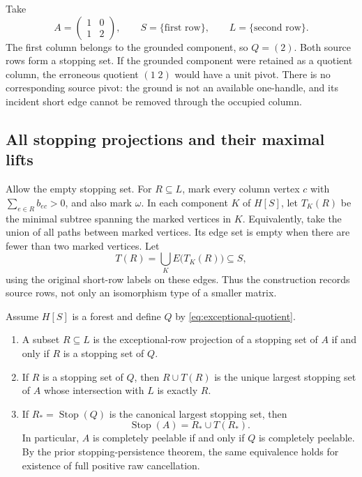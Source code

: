 \begin{example}
Take
\[
 A=\begin{pmatrix}1&0\\1&2\end{pmatrix},
 \qquad S=\{\text{first row}\},\qquad
 L=\{\text{second row}\}.
\]
The first column belongs to the grounded component, so $Q=(2)$. Both
source rows form a stopping set. If the grounded component were retained
as a quotient column, the erroneous quotient $(1\;2)$ would have a unit
pivot. There is no corresponding source pivot: the ground is not an
available one-handle, and its incident short edge cannot be removed
through the occupied column.
\end{example}

\subsection{All stopping projections and their maximal lifts}

Allow the empty stopping set. For $R\subseteq L$, mark every column
vertex $c$ with $\sum_{e\in R}b_{ec}>0$, and also mark $\omega$.
In each component $K$ of $H[S]$, let $T_K(R)$ be the minimal subtree
spanning the marked vertices in $K$. Equivalently, take the union of all
paths between marked vertices. Its edge set is empty when there are fewer
than two marked vertices. Let
\[
 T(R)=\bigcup_K E\bigl(T_K(R)\bigr)\subseteq S,
\]
using the original short-row labels on these edges. Thus the construction
records source rows, not only an isomorphism type of a smaller matrix.

\begin{theorem}
\label{thm:residual-kernel}
Assume $H[S]$ is a forest and define $Q$ by
\eqref{eq:exceptional-quotient}.
\begin{enumerate}
\item A subset $R\subseteq L$ is the exceptional-row projection of a
stopping set of $A$ if and only if $R$ is a stopping set of $Q$.
\item If $R$ is a stopping set of $Q$, then $R\cup T(R)$ is the unique
largest stopping set of $A$ whose intersection with $L$ is exactly $R$.
\item If $R_* = \operatorname{Stop}(Q)$ is the canonical largest
stopping set, then
\begin{equation}
 \operatorname{Stop}(A)=R_*\cup T(R_*).
 \label{eq:stopping-lift}
\end{equation}
In particular, $A$ is completely peelable if and only if $Q$ is
completely peelable. By the prior stopping-persistence theorem, the same
equivalence holds for existence of full positive raw cancellation.
\end{enumerate}
\end{theorem}

